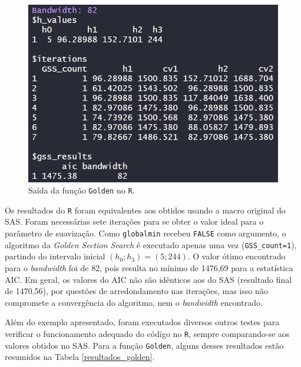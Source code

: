 \documentclass[12pt, a4paper, twoside]{report}
\numberwithin{equation}{section} %
\begin{document}
\begin{figure}[H]
    \centering
    \includegraphics{golden_R.PNG}
    \caption{Saída da função \texttt{Golden} no \texttt{R}.}
\label{fig:golden_R}
\end{figure}

Os resultados do \texttt{R} foram equivalentes aos obtidos usando a macro original do SAS. Foram necessárias sete iterações para se obter o valor ideal para o parâmetro de suavização. Como \texttt{globalmin} recebeu \texttt{FALSE} como argumento, o algoritmo da \textit{Golden Section Search} é executado apenas uma vez (\texttt{GSS\_count=1}), partindo do intervalo inicial $(h_0; h_3)=(5; 244)$. O valor ótimo encontrado para o \textit{bandwidth} foi de 82, pois resulta no mínimo de 1476,69 para a estatística AIC. Em geral, os valores do AIC não são idênticos aos do SAS (resultado final de 1470,56), por questões de arredondamento nas iterações, mas isso não compromete a convergência do algoritmo, nem o \textit{bandwidth} encontrado.

Além do exemplo apresentado, foram executados diversos outros testes para verificar o funcionamento adequado do código no \texttt{R}, sempre comparando-se aos valores obtidos no SAS. Para a função \texttt{Golden}, alguns desses resultados estão resumidos na Tabela \ref{resultados_golden}.
\end{document}
